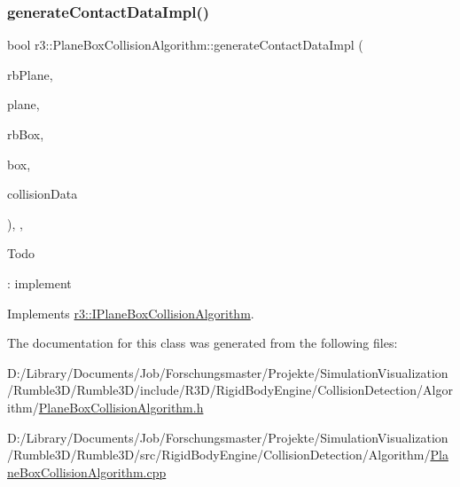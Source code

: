 \subsubsection{\texorpdfstring{generate\+Contact\+Data\+Impl()}{generateContactDataImpl()}}
{\footnotesize\ttfamily bool r3\+::\+Plane\+Box\+Collision\+Algorithm\+::generate\+Contact\+Data\+Impl (\begin{DoxyParamCaption}\item[{\mbox{\hyperlink{classr3_1_1_rigid_body}{Rigid\+Body}} $\ast$}]{rb\+Plane,  }\item[{\mbox{\hyperlink{classr3_1_1_collision_plane}{Collision\+Plane}} $\ast$}]{plane,  }\item[{\mbox{\hyperlink{classr3_1_1_rigid_body}{Rigid\+Body}} $\ast$}]{rb\+Box,  }\item[{\mbox{\hyperlink{classr3_1_1_collision_box}{Collision\+Box}} $\ast$}]{box,  }\item[{\mbox{\hyperlink{classr3_1_1_collision_data}{Collision\+Data}} \&}]{collision\+Data }\end{DoxyParamCaption})\hspace{0.3cm}{\ttfamily [override]}, {\ttfamily [protected]}, {\ttfamily [virtual]}}

\begin{DoxyRefDesc}{Todo}
\item[\mbox{\hyperlink{todo__todo000008}{Todo}}]\+: implement \end{DoxyRefDesc}


Implements \mbox{\hyperlink{classr3_1_1_i_plane_box_collision_algorithm_a48f6ca7613a0cc7c64d8e0cfe34674e8}{r3\+::\+I\+Plane\+Box\+Collision\+Algorithm}}.



The documentation for this class was generated from the following files\+:\begin{DoxyCompactItemize}
\item 
D\+:/\+Library/\+Documents/\+Job/\+Forschungsmaster/\+Projekte/\+Simulation\+Visualization/\+Rumble3\+D/\+Rumble3\+D/include/\+R3\+D/\+Rigid\+Body\+Engine/\+Collision\+Detection/\+Algorithm/\mbox{\hyperlink{_plane_box_collision_algorithm_8h}{Plane\+Box\+Collision\+Algorithm.\+h}}\item 
D\+:/\+Library/\+Documents/\+Job/\+Forschungsmaster/\+Projekte/\+Simulation\+Visualization/\+Rumble3\+D/\+Rumble3\+D/src/\+Rigid\+Body\+Engine/\+Collision\+Detection/\+Algorithm/\mbox{\hyperlink{_plane_box_collision_algorithm_8cpp}{Plane\+Box\+Collision\+Algorithm.\+cpp}}\end{DoxyCompactItemize}
